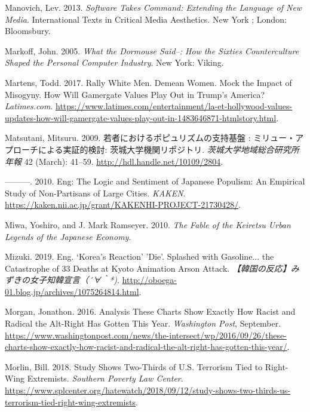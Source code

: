 \documentclass[10pt,british,A4paper,,openany]{memoir}
\begin{document}
\hypertarget{ref-manovich_software_2013}{}
Manovich, Lev. 2013. \emph{Software Takes Command: Extending the
Language of New Media}. International Texts in Critical Media
Aesthetics. New York ; London: Bloomsbury.

\hypertarget{ref-markoff_what_2005}{}
Markoff, John. 2005. \emph{What the Dormouse Said--: How the Sixties
Counterculture Shaped the Personal Computer Industry}. New York: Viking.

\hypertarget{ref-martens_rally_2017}{}
Martens, Todd. 2017. Rally White Men. Demean Women. Mock the Impact of
Misogyny. How Will Gamergate Values Play Out in Trump's America?
\emph{Latimes.com}.
\url{https://www.latimes.com/entertainment/la-et-hollywood-values-updates-how-will-gamergate-values-play-out-in-1483646871-htmlstory.html}.

\hypertarget{ref-matsutani__2009}{}
Matsutani, Mitsuru. 2009. 若者におけるポピュリズムの支持基盤 :
ミリュー・アプローチによる実証的検討: 茨城大学機関リポジトリ.
\emph{茨城大学地域総合研究所年報} 42 (March): 41--59.
\url{http://hdl.handle.net/10109/2804}.

\hypertarget{ref-matsutani_eng:_2010}{}
---------. 2010. Eng: The Logic and Sentiment of Japanese Populism: An
Empirical Study of Non-Partisans of Large Cities. \emph{KAKEN}.
\url{https://kaken.nii.ac.jp/grant/KAKENHI-PROJECT-21730428/}.

\hypertarget{ref-miwa_fable_2010}{}
Miwa, Yoshiro, and J. Mark Ramseyer. 2010. \emph{The Fable of the
Keiretsu Urban Legends of the Japanese Economy}.

\hypertarget{ref-mizuki_eng._2019}{}
Mizuki. 2019. Eng. `Korea's Reaction' 'Die'. Splashed with Gasoline...
the Catastrophe of 33 Deaths at Kyoto Animation Arson Attack.
\emph{【韓国の反応】みずきの女子知韓宣言（´∀｀*)}.
\url{http://oboega-01.blog.jp/archives/1075264814.html}.

\hypertarget{ref-morgan_analysis_2016}{}
Morgan, Jonathon. 2016. Analysis These Charts Show Exactly How Racist
and Radical the Alt-Right Has Gotten This Year. \emph{Washington Post},
September.
\url{https://www.washingtonpost.com/news/the-intersect/wp/2016/09/26/these-charts-show-exactly-how-racist-and-radical-the-alt-right-has-gotten-this-year/}.

\hypertarget{ref-morlin_study_2018}{}
Morlin, Bill. 2018. Study Shows Two-Thirds of U.S. Terrorism Tied to
Right-Wing Extremists. \emph{Southern Poverty Law Center}.
\url{https://www.splcenter.org/hatewatch/2018/09/12/study-shows-two-thirds-us-terrorism-tied-right-wing-extremists}.
\end{document}
